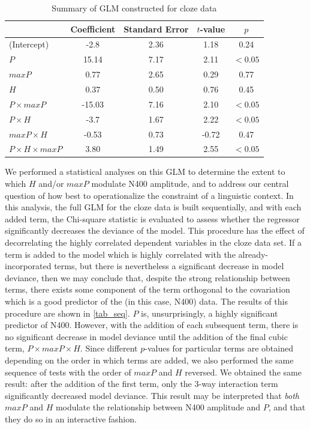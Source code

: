 \documentclass{article}
\begin{document}
\begin{table}
\centering
	\caption{Summary of GLM constructed for cloze data \label{tab_glm_summary}}
	\begin{tabular}{l|cccc}
							&	Coefficient	&	Standard Error	&	$t$-value 	&	$p$\\
                            \hline
(Intercept)                 &	-2.8		&	2.36			&	1.18		&	0.24\\
$P$							&	15.14		&	7.17			&	2.11		&	$\mathbf{<0.05}$\\
$maxP$						&	0.77		&	2.65			&	0.29		&	0.77\\
$H$							&	0.37		&	0.50			&	0.76		&	0.45\\
$P\times{}maxP$				&	-15.03		&	7.16			&	2.10		&	$\mathbf{<0.05}$\\
$P\times{}H$				&	-3.7		&	1.67			&	2.22		&	$\mathbf{<0.05}$\\
$maxP\times{}H$				&	-0.53		&	0.73			&	-0.72		&	0.47\\
$P\times{}H\times{}maxP$	&	3.80		&	1.49			&	2.55		&	$\mathbf{<0.05}$\\
	\end{tabular}
\end{table}

We performed a statistical analyses on this GLM to determine the extent to which $H$ and/or $maxP$ modulate N400 amplitude, and to address our central question of how best to operationalize the constraint of a linguistic context. In this analysis, the full GLM for the cloze data is built sequentially, and with each added term, the Chi-square statistic is evaluated to assess whether the regressor significantly decreases the deviance of the model. This procedure has the effect of decorrelating the highly correlated dependent variables in the cloze data set. If a term is added to the model which is highly correlated with the already-incorporated terms, but there is nevertheless a significant decrease in model deviance, then we may conclude that, despite the strong relationship between terms, there exists some component of the term orthogonal to the covariation which is a good predictor of the (in this case, N400) data.
The results of this procedure are shown in \ref{tab_seq}. $P$ is, unsurprisingly, a highly significant predictor of N400. However, with the addition of each subsequent term, there is no significant decrease in model deviance until the addition of the final cubic term, $P\times{}maxP\times{}H$. Since different $p$-values for particular terms are obtained depending on the order in which terms are added, we also performed the same sequence of tests with the order of $maxP$ and $H$ reversed. We obtained the same result: after the addition of the first term, only the 3-way interaction term significantly decreased model deviance. This result may be interpreted that \emph{both} $maxP$ and $H$ modulate the relationship between N400 amplitude and $P$, and that they do so in an interactive fashion.
\end{document}
